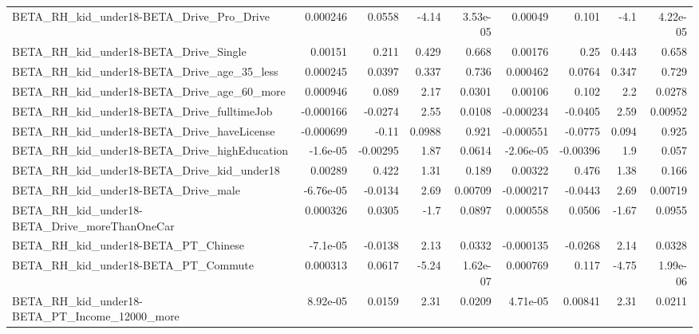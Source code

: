 \begin{tabular}{lrrrrrrrr}
BETA\_RH\_kid\_under18-BETA\_Drive\_Pro\_Drive           &    0.000246 &       0.0558 &     -4.14 & 3.53e-05 &    0.00049 &       0.101 &         -4.1 &      4.22e-05 \\
BETA\_RH\_kid\_under18-BETA\_Drive\_Single              &     0.00151 &        0.211 &     0.429 &    0.668 &    0.00176 &        0.25 &        0.443 &         0.658 \\
BETA\_RH\_kid\_under18-BETA\_Drive\_age\_35\_less         &    0.000245 &       0.0397 &     0.337 &    0.736 &   0.000462 &      0.0764 &        0.347 &         0.729 \\
BETA\_RH\_kid\_under18-BETA\_Drive\_age\_60\_more         &    0.000946 &        0.089 &      2.17 &   0.0301 &    0.00106 &       0.102 &          2.2 &        0.0278 \\
BETA\_RH\_kid\_under18-BETA\_Drive\_fulltimeJob         &   -0.000166 &      -0.0274 &      2.55 &   0.0108 &  -0.000234 &     -0.0405 &         2.59 &       0.00952 \\
BETA\_RH\_kid\_under18-BETA\_Drive\_haveLicense         &   -0.000699 &        -0.11 &    0.0988 &    0.921 &  -0.000551 &     -0.0775 &        0.094 &         0.925 \\
BETA\_RH\_kid\_under18-BETA\_Drive\_highEducation       &    -1.6e-05 &     -0.00295 &      1.87 &   0.0614 &  -2.06e-05 &    -0.00396 &          1.9 &         0.057 \\
BETA\_RH\_kid\_under18-BETA\_Drive\_kid\_under18         &     0.00289 &        0.422 &      1.31 &    0.189 &    0.00322 &       0.476 &         1.38 &         0.166 \\
BETA\_RH\_kid\_under18-BETA\_Drive\_male                &   -6.76e-05 &      -0.0134 &      2.69 &  0.00709 &  -0.000217 &     -0.0443 &         2.69 &       0.00719 \\
BETA\_RH\_kid\_under18-BETA\_Drive\_moreThanOneCar      &    0.000326 &       0.0305 &      -1.7 &   0.0897 &   0.000558 &      0.0506 &        -1.67 &        0.0955 \\
BETA\_RH\_kid\_under18-BETA\_PT\_Chinese                &    -7.1e-05 &      -0.0138 &      2.13 &   0.0332 &  -0.000135 &     -0.0268 &         2.14 &        0.0328 \\
BETA\_RH\_kid\_under18-BETA\_PT\_Commute                &    0.000313 &       0.0617 &     -5.24 & 1.62e-07 &   0.000769 &       0.117 &        -4.75 &      1.99e-06 \\
BETA\_RH\_kid\_under18-BETA\_PT\_Income\_12000\_more      &    8.92e-05 &       0.0159 &      2.31 &   0.0209 &   4.71e-05 &     0.00841 &         2.31 &        0.0211 \\

\end{tabular}
